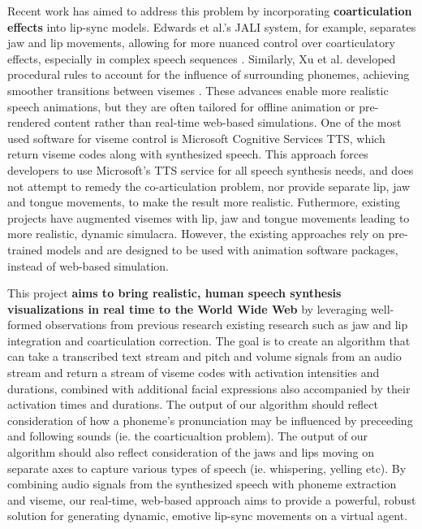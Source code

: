 \documentclass[12pt]{article}
\begin{document}
Recent work has aimed to address this problem by incorporating {\bf coarticulation effects} into lip-sync models. Edwards et al.’s JALI system, for example, separates jaw and lip movements, allowing for more nuanced control over coarticulatory effects, especially in complex speech sequences \cite{Edwards2016}. Similarly, Xu et al. \cite{Xu213} developed procedural rules to account for the influence of surrounding phonemes, achieving smoother transitions between visemes . These advances enable more realistic speech animations, but they are often tailored for offline animation or pre-rendered content rather than real-time web-based simulations.
One of the most used software for viseme control is Microsoft Cognitive Services TTS, which return viseme codes along with synthesized speech. This approach forces developers to use Microsoft's TTS service for all speech synthesis needs, and does not attempt to remedy the co-articulation problem, nor provide separate lip, jaw and tongue movements, to make the result more realistic.  Futhermore, existing projects have augmented visemes with lip, jaw and tongue movements leading to  more realistic, dynamic simulacra. However, the existing approaches rely on pre-trained models and are designed to be used with animation software packages, instead of web-based simulation.  

 This project {\bf aims to bring realistic, human speech synthesis visualizations in real time to the World Wide Web} by leveraging well-formed observations from previous research existing research such as jaw and lip integration and coarticulation correction.
The goal is to create an algorithm that can take a transcribed text stream and pitch and volume signals from an audio stream and return a stream of viseme codes with activation intensities and durations, combined with additional facial expressions also accompanied by their activation times and durations.  The  output of our algorithm should reflect consideration of how a phoneme's pronunciation may be influenced by preceeding and following sounds (ie. the coarticualtion problem). The output of our algorithm should also reflect consideration of the jaws and lips moving on separate axes to capture various types of speech (ie. whispering, yelling etc). 
By combining audio signals from the synthesized speech with phoneme extraction and viseme, our real-time, web-based approach aims to provide a powerful, robust solution for generating dynamic, emotive lip-sync movements on a virtual agent. 
\end{document}

